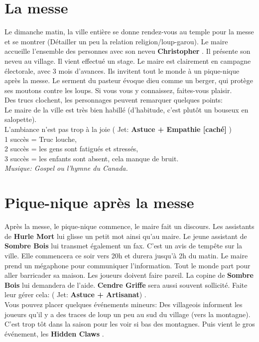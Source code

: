 \documentclass[oneside,12pt]{book}
\newcommand\roll[1]{
( Jet: \textbf{#1})
}
\newcommand{\Luke}{\textbf{Cendre Griffe} }
\newcommand{\Peter}{\textbf{Hurle Mort} }
\newcommand{\Leonard}{\textbf{Sombre Bois} }
\newcommand{\Christopher}{\textbf{Christopher} }
\newcommand{\Hidden}{\textbf{Hidden Claws} }
\begin{document}
\begin{flushleft}
\section{La messe}
Le dimanche matin, la ville entière se donne rendez-vous au temple pour la messe et se montrer (Détailler un peu la relation religion/loup-garou). 
Le maire accueille l'ensemble des personnes avec son neveu \Christopher. Il présente son neveu au village. Il vient effectué un stage. Le maire est clairement en campagne électorale, avec 3 mois d'avances. Ils invitent tout le monde à un pique-nique après la messe.
Le serment du pasteur évoque dieu comme un berger, qui protège ses moutons contre les loups. Si vous vous y connaissez, faites-vous plaisir. \\ 
Des trucs clochent, les personnages peuvent remarquer quelques points: \\
Le maire de la ville est très bien habillé (d'habitude, c'est plutôt un bouseux en salopette).\\ 
L'ambiance n'est pas trop à la joie \roll{Astuce + Empathie [caché] }\\  1 succès = Truc louche,\\  2 succès = les gens sont fatigués et stressés,\\  3 succès = les enfants sont absent, cela manque de bruit.\\
\textit{Musique: Gospel ou l'hymne du Canada.}

\section{Pique-nique après la messe}
Après la messe, le pique-nique commence, le maire fait un discours. Les assistants de \Peter lui glisse un petit mot ainsi qu'au maire. 
Le jeune assistant de \Leonard lui transmet également un fax. 
C'est un avis de tempête sur la ville. Elle commencera ce soir vers 20h et durera jusqu’à 2h du matin. 
Le maire prend un mégaphone pour communiquer l'information. Tout le monde part pour aller barricader sa maison. 
Les joueurs doivent faire pareil. La copine de \Leonard lui demandera de l'aide. 
\Luke sera aussi souvent sollicité. Faite leur gérer cela: \roll{Astuce + Artisanat}.  \\

Vous pouvez placer quelques événements mineurs: Des villageois informent les joueurs qu'il y a des traces de loup un peu au sud du village (vers la montagne). 
C'est trop tôt dans la saison pour les voir si bas des montagnes.
Puis vient le gros événement, les \Hidden.


\end{flushleft}
\end{document}
